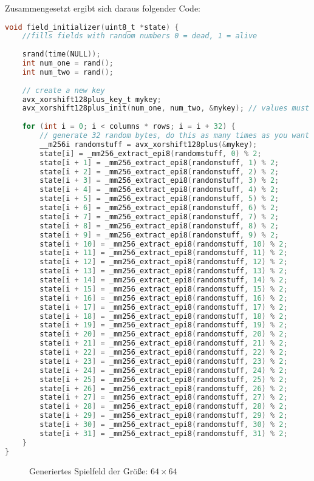 \documentclass[german,plainarticle,hyperref,utf8]{zihpub}
\begin{document}
	Zusammengesetzt ergibt sich daraus folgender Code:\\
	
	\begin{lstlisting}[language=C, caption=Daten Initialisierung]
void field_initializer(uint8_t *state) {
	//fills fields with random numbers 0 = dead, 1 = alive
	
	srand(time(NULL));
	int num_one = rand();
	int num_two = rand();
	
	// create a new key
	avx_xorshift128plus_key_t mykey;
	avx_xorshift128plus_init(num_one, num_two, &mykey); // values must be non-zero
	
	for (int i = 0; i < columns * rows; i = i + 32) {
		// generate 32 random bytes, do this as many times as you want
		__m256i randomstuff = avx_xorshift128plus(&mykey);
		state[i] = _mm256_extract_epi8(randomstuff, 0) % 2;
		state[i + 1] = _mm256_extract_epi8(randomstuff, 1) % 2;
		state[i + 2] = _mm256_extract_epi8(randomstuff, 2) % 2;
		state[i + 3] = _mm256_extract_epi8(randomstuff, 3) % 2;
		state[i + 4] = _mm256_extract_epi8(randomstuff, 4) % 2;
		state[i + 5] = _mm256_extract_epi8(randomstuff, 5) % 2;
		state[i + 6] = _mm256_extract_epi8(randomstuff, 6) % 2;
		state[i + 7] = _mm256_extract_epi8(randomstuff, 7) % 2;
		state[i + 8] = _mm256_extract_epi8(randomstuff, 8) % 2;
		state[i + 9] = _mm256_extract_epi8(randomstuff, 9) % 2;
		state[i + 10] = _mm256_extract_epi8(randomstuff, 10) % 2;
		state[i + 11] = _mm256_extract_epi8(randomstuff, 11) % 2;
		state[i + 12] = _mm256_extract_epi8(randomstuff, 12) % 2;
		state[i + 13] = _mm256_extract_epi8(randomstuff, 13) % 2;
		state[i + 14] = _mm256_extract_epi8(randomstuff, 14) % 2;
		state[i + 15] = _mm256_extract_epi8(randomstuff, 15) % 2;
		state[i + 16] = _mm256_extract_epi8(randomstuff, 16) % 2;
		state[i + 17] = _mm256_extract_epi8(randomstuff, 17) % 2;
		state[i + 18] = _mm256_extract_epi8(randomstuff, 18) % 2;
		state[i + 19] = _mm256_extract_epi8(randomstuff, 19) % 2;
		state[i + 20] = _mm256_extract_epi8(randomstuff, 20) % 2;
		state[i + 21] = _mm256_extract_epi8(randomstuff, 21) % 2;
		state[i + 22] = _mm256_extract_epi8(randomstuff, 22) % 2;
		state[i + 23] = _mm256_extract_epi8(randomstuff, 23) % 2;
		state[i + 24] = _mm256_extract_epi8(randomstuff, 24) % 2;
		state[i + 25] = _mm256_extract_epi8(randomstuff, 25) % 2;
		state[i + 26] = _mm256_extract_epi8(randomstuff, 26) % 2;
		state[i + 27] = _mm256_extract_epi8(randomstuff, 27) % 2;
		state[i + 28] = _mm256_extract_epi8(randomstuff, 28) % 2;
		state[i + 29] = _mm256_extract_epi8(randomstuff, 29) % 2;
		state[i + 30] = _mm256_extract_epi8(randomstuff, 30) % 2;
		state[i + 31] = _mm256_extract_epi8(randomstuff, 31) % 2;
	}
}\end{lstlisting}
	\begin{figure}[h]
		\begin{center}
		\end{center}
		\caption{Generiertes Spielfeld der Größe: $64\times 64$}
	\end{figure}
	
\end{document}
